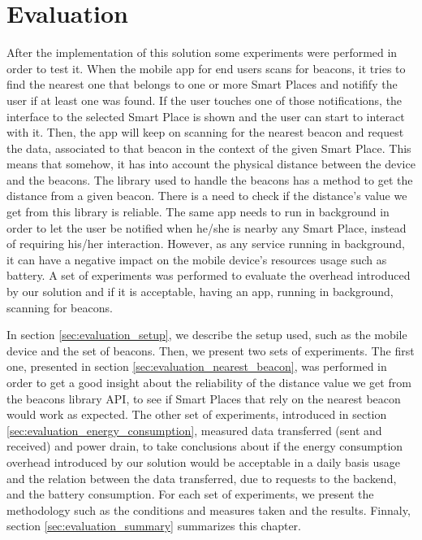
\chapter{Evaluation}
\label{chapter:evaluation}

After the implementation of this solution some experiments were performed in order to test it.
When the mobile app for end users scans for beacons, it tries to find the nearest one that belongs to one or more Smart Places and notifify the user if at least one was found.
If the user touches one of those notifications, the interface to the selected Smart Place is shown and the user can start to interact with it.
Then, the app will keep on scanning for the nearest beacon and request the data, associated to that beacon in the context of the given Smart Place.
This means that somehow, it has into account the physical distance between the device and the beacons.
The library used to handle the beacons has a method to get the distance from a given beacon.
There is a need to check if the distance's value we get from this library is reliable.
The same app needs to run in background in order to let the user be notified when he/she is nearby any Smart Place, instead of requiring his/her interaction.
However, as any service running in background, it can have a negative impact on the mobile device's resources usage such as battery.
A set of experiments was performed to evaluate the overhead introduced by our solution and if it is acceptable, having an app, running in background, scanning for beacons.

In section \ref{sec:evaluation_setup}, we describe the setup used, such as the mobile device and the set of beacons.
Then, we present two sets of experiments.
The first one, presented in section \ref{sec:evaluation_nearest_beacon}, was performed in order to get a good insight about the reliability of the distance value we get from the beacons library \gls{API}, to see if Smart Places that rely on the nearest beacon would work as expected.
The other set of experiments, introduced in section \ref{sec:evaluation_energy_consumption}, measured data transferred (sent and received) and power drain, to take conclusions about if the energy consumption overhead introduced by our solution would be acceptable in a daily basis usage and the relation between the data transferred, due to requests to the backend, and the battery consumption.
For each set of experiments, we present the methodology such as the conditions and measures taken and the results.
Finnaly, section \ref{sec:evaluation_summary} summarizes this chapter.

